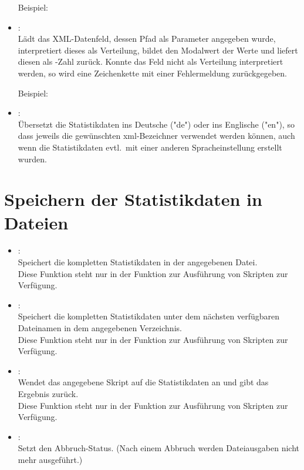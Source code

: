 \begin{itemize}
Beispiel:\\

\item
{}:\\
Lädt das XML-Datenfeld, dessen Pfad als Parameter angegeben wurde, interpretiert dieses als Verteilung,
bildet den Modalwert der Werte und liefert diesen als -Zahl zurück.
Konnte das Feld nicht als Verteilung interpretiert werden, so wird eine Zeichenkette mit einer Fehlermeldung
zurückgegeben.

Beispiel:\\

\item
{}:\\
Übersetzt die Statistikdaten ins Deutsche ("{}de") oder ins Englische ("{}en"), so dass jeweils die gewünschten
xml-Bezeichner verwendet werden können, auch wenn die Statistikdaten evtl.\ mit einer anderen Spracheinstellung
erstellt wurden.

\end{itemize}

\section{Speichern der Statistikdaten in Dateien}

\begin{itemize}

\item
{}:\\
Speichert die kompletten Statistikdaten in der angegebenen Datei.\\
Diese Funktion steht nur in der Funktion zur Ausführung von Skripten zur Verfügung.

\item
{}:\\
Speichert die kompletten Statistikdaten unter dem nächsten verfügbaren Dateinamen in dem angegebenen Verzeichnis.\\
Diese Funktion steht nur in der Funktion zur Ausführung von Skripten zur Verfügung.

\item
{}:\\
Wendet das angegebene Skript auf die Statistikdaten an und gibt das Ergebnis zurück.\\
Diese Funktion steht nur in der Funktion zur Ausführung von Skripten zur Verfügung.

\item
{}:\\
Setzt den Abbruch-Status. (Nach einem Abbruch werden Dateiausgaben nicht mehr ausgeführt.)

\end{itemize}

